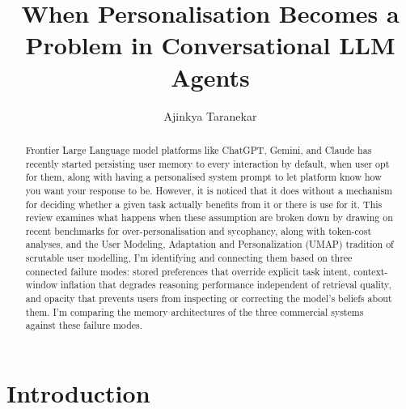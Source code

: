 \documentclass[runningheads]{llncs}
\begin{document}
\title{When Personalisation Becomes a Problem in Conversational LLM Agents}


\author{Ajinkya Taranekar}



\maketitle

\begin{abstract}
Frontier Large Language model platforms like ChatGPT, Gemini, and Claude has recently started persisting user memory to every interaction by default, when user opt for them, along with having a personalised system prompt to let platform know how you want your response to be. However, it is noticed that it does without a mechanism for deciding whether a given task actually benefits from it or there is use for it. This review examines what happens when these assumption are broken down by drawing on recent benchmarks for over-personalisation and sycophancy, along with token-cost analyses, and the User Modeling, Adaptation and Personalization (UMAP) tradition of scrutable user modelling, I'm identifying and connecting them based on three connected failure modes: stored preferences that override explicit task intent, context-window inflation that degrades reasoning performance independent of retrieval quality, and opacity that prevents users from inspecting or correcting the model's beliefs about them. I'm comparing the memory architectures of the three commercial systems against these failure modes.

\end{abstract}


\section{Introduction}
\label{sec:intro}
\end{document}
